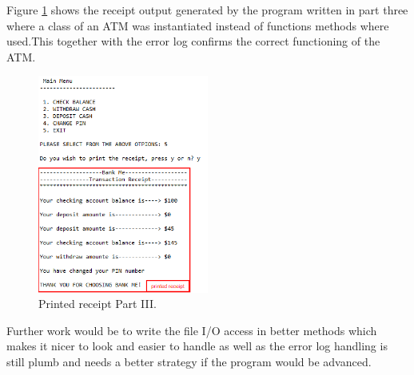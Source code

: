 Figure \ref{fig: printed_receipt_partIII} shows the receipt output generated by the program written in part three where a class of an ATM was instantiated instead of functions methods where used.This together with the error log confirms the correct functioning of the ATM.
\begin{figure}[H]
	\centering
	\includegraphics[width=0.5\textwidth]{01_images/printed_receipt_partIII.PNG}
	\caption{Printed receipt Part III.}
	\label{fig: printed_receipt_partIII}
\end{figure}

Further work would be to write the file I/O access in better methods which makes it nicer to look and easier to handle as well as the error log handling is still plumb and needs a better strategy if the program would be advanced.